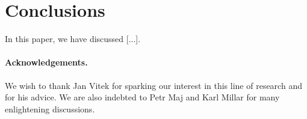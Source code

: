 \section{Conclusions}
\label{se:conclusions}

In this paper, we have discussed [...].

\paragraph{Acknowledgements.}

We wish to thank Jan Vitek for sparking our interest in this line of research and for his advice. We are also indebted to Petr Maj and Karl Millar for many enlightening discussions.

  
  
  